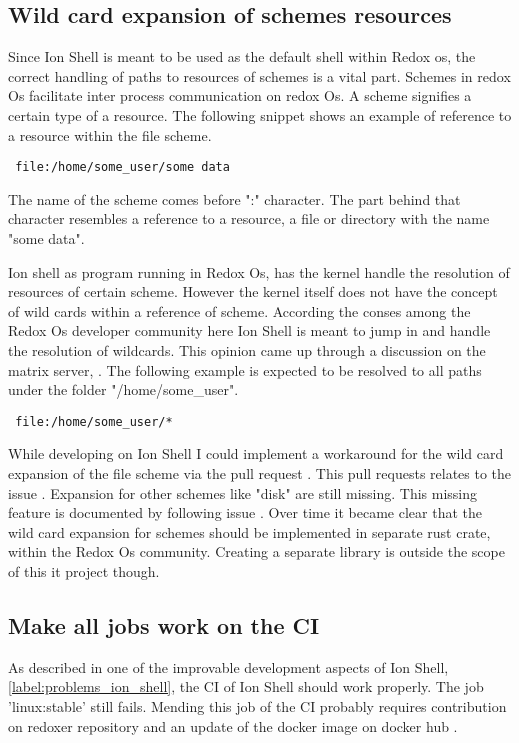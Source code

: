 \subsection{Wild card expansion of schemes resources}

Since Ion Shell is meant to be used as the default shell within Redox os,
the correct handling of paths to resources of schemes is a vital part.
Schemes in redox Os facilitate inter process communication on redox Os.
A scheme signifies a certain type of a resource.
The following snippet shows an example of reference to a resource within the file scheme.
\begin{verbatim}
 file:/home/some_user/some data
\end{verbatim}
The name of the scheme comes before ":" character.
The part behind that character resembles a reference to a resource, a file or directory with the name "some data".

Ion shell as program running in Redox Os, has the kernel handle the resolution of resources of certain scheme.
However the kernel itself does not have the concept of wild cards within a reference of scheme.
According the conses among the Redox Os developer community here Ion Shell is meant to jump in and handle the resolution of wildcards.
This opinion came up through a discussion on the matrix server, \cite{matrix_channel}.
The following example is expected to be resolved to all paths under the folder "/home/some\_user".
\begin{verbatim}
 file:/home/some_user/*
\end{verbatim}

While developing on Ion Shell I could implement a workaround for the wild card expansion of the file scheme
via the pull request \cite{pr_file_scheme} .
This pull requests relates to the issue \cite{issue_file_scheme}.
Expansion for other schemes like "disk" are still missing.
This missing feature is documented by following issue \cite{issue_disk_scheme}.
Over time it became clear that the wild card expansion for schemes should be implemented in separate rust crate, within the Redox Os community.
Creating a separate library is outside the scope of this it project though.

\subsection{Make all jobs work on the CI}

As described in one of the improvable development aspects of Ion Shell, \ref{label:problems_ion_shell}, the CI of Ion Shell should
work properly. The job 'linux:stable' still fails. Mending this job of the CI probably requires contribution
on redoxer repository \cite{link_repos_redoxer} and an update of  the docker image on docker hub \cite{docker_hub_redoxer}.

